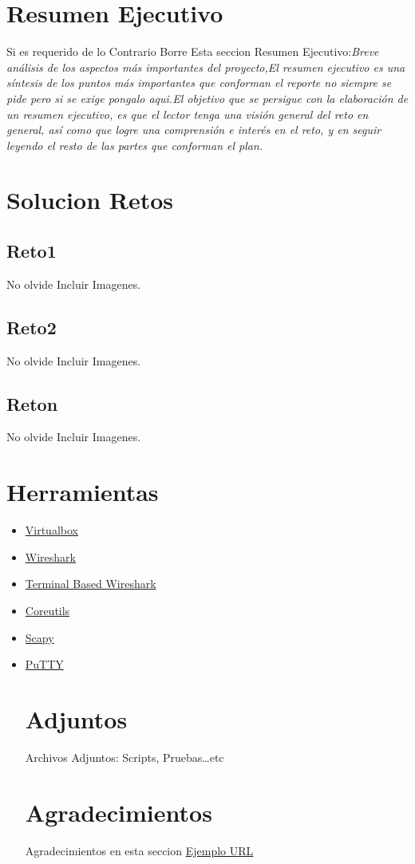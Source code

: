 \documentclass[a4paper]{article}
\begin{document}
\section{Resumen Ejecutivo}Si es requerido de lo Contrario Borre Esta seccion Resumen Ejecutivo:\textit{Breve análisis de los aspectos más importantes del proyecto,El resumen ejecutivo es una s\'intesis de los puntos más importantes que conforman el reporte no siempre se pide pero si se exige pongalo aqui.El objetivo que se persigue con la elaboración de un resumen ejecutivo, es que el lector tenga una visión general del reto en general, así como que logre una comprensión e interés en el reto, y en seguir leyendo el resto de las partes que conforman el plan.}
\section{Solucion Retos \label{SolRet}}
\subsection{Reto1}
No olvide Incluir Imagenes.

\subsection{Reto2}
No olvide Incluir Imagenes.
\subsection{Reton}
No olvide Incluir Imagenes.
\clearpage
\newpage
\section{Herramientas \label{Herramientas}}
\begin{itemize}
Liste aqui la lista de herramientas.
\item \href{http://virtualbox.org}{Virtualbox}
\item \href{www.wireshark.org}{Wireshark}
\item \href{www.wireshark.org}{Terminal Based Wireshark}
\item \href{http://www.gnu.org/software/coreutils/}{Coreutils}
\item \href{http://www.secdev.org/projects/scapy/}{Scapy}
\item \href{http://www.chiark.greenend.org.uk/~sgtatham/putty/}{PuTTY}\\
\section{Adjuntos}
Archivos Adjuntos: Scripts, Pruebas\ldots etc 
\section{Agradecimientos}
Agradecimientos en esta seccion \href{http://www.ejemplourl.org}{Ejemplo URL} 

\end{itemize}
\end{document}
